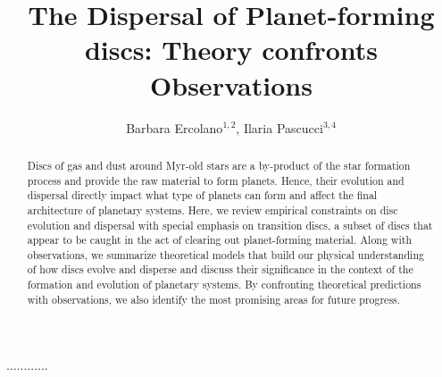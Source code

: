 \documentclass{rsos}
\begin{document}
\title{The Dispersal of Planet-forming discs: Theory confronts Observations}
\newcommand{\angstrom}{\mbox{\normalfont\AA}}
\newcommand{\micron}{$\mu$m}
\def\mnras{{MNRAS}}
\def\apj{{ApJ}} 
\def\apjl{{ApJL}}
\def\aj{{AJ}} 
\def\aap{{A\&A}}
\def\pasa{{PASA}}
\def\nat{{Nature}}
\def\pasp{{PASP}}
\def\araa{{ARA\&A}}
\def\ssr{{Space Science Reviews}}
\def\apjs{{ApJS}}
\def\icarus{{Icarus}}

\author{Barbara Ercolano$^{1,2}$, Ilaria Pascucci$^{3,4}$}
\address{$^1$Universit\"ats-Sternwarte M\"unchen, Scheinerstr. 1, 81679 M\"unchen, Germany\\
$^2$Excellence Cluster Origin and Structure of the Universe,
Boltzmannstr.2, 85748 Garching bei M\"unchen, Germany\\
$^3$Lunar and Planetary Laboratory, The University of Arizona, Tucson, AZ 85721, USA\\
$^4$Earths in Other Solar Systems Team, NASA Nexus for Exoplanet System Science\\}
\subject{Astrophysics}
\begin{abstract}
Discs of gas and dust around Myr-old stars are a by-product of the star formation process and provide the raw material to form planets. Hence, their evolution and dispersal directly impact what type of planets can form and affect the final architecture of planetary systems. Here, we review empirical constraints on disc evolution and dispersal with special emphasis on transition discs, a subset of discs that appear to be caught in the act of clearing out planet-forming material. Along with observations, we summarize theoretical models that build our physical understanding of how discs evolve and disperse and discuss their significance in the context of the formation and evolution of planetary systems. By confronting theoretical predictions with observations,  we also identify the most promising areas for future progress.
\end{abstract}
\begin{fmtext}
............
\end{fmtext}
\maketitle
\end{document}
